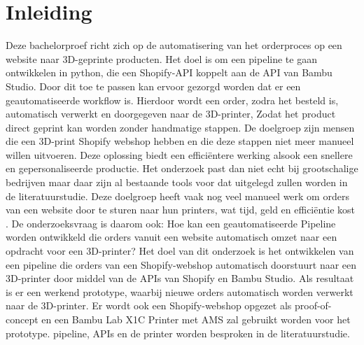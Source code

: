 


% 

\section{Inleiding}%
\label{sec:inleiding}

Deze bachelorproef richt zich op de automatisering van het orderproces op een website naar 3D-geprinte producten. Het doel is om een pipeline te gaan ontwikkelen in python, die een Shopify-API koppelt aan de API van Bambu Studio. Door dit toe te passen kan ervoor gezorgd worden dat er een geautomatiseerde workflow is. Hierdoor wordt een order, zodra het besteld is, automatisch verwerkt en doorgegeven naar de 3D-printer, Zodat het product direct geprint kan worden zonder handmatige stappen.
\vspace{1em}
De doelgroep zijn mensen die een 3D-print Shopify webshop hebben en die deze stappen niet meer manueel willen uitvoeren. Deze oplossing biedt een efficiëntere werking alsook een snellere en gepersonaliseerde productie. Het onderzoek past dan niet echt bij grootschalige bedrijven maar daar zijn al bestaande tools voor dat uitgelegd zullen worden in de literatuurstudie.
\vspace{1em}
Deze doelgroep heeft vaak nog veel manueel werk om orders van een website door te sturen naar hun printers, wat tijd, geld en efficiëntie kost . De onderzoeksvraag is daarom ook: Hoe kan een geautomatiseerde Pipeline worden ontwikkeld die orders vanuit een website automatisch omzet naar een opdracht voor een 3D-printer?
\vspace{1em}
Het doel van dit onderzoek is het ontwikkelen van een pipeline die orders van een Shopify-webshop automatisch doorstuurt naar een 3D-printer door middel van de APIs van Shopify en Bambu Studio. Als resultaat is er een werkend prototype, waarbij nieuwe orders automatisch worden verwerkt naar de 3D-printer. Er wordt ook een Shopify-webshop opgezet als proof-of-concept en een Bambu Lab  X1C Printer met AMS zal gebruikt worden voor het prototype. pipeline, APIs en de printer worden besproken in de literatuurstudie.


